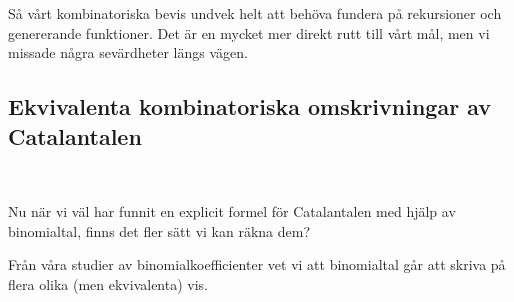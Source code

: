 \documentclass{tufte-handout}
\begin{document}
Så vårt kombinatoriska bevis undvek helt att behöva fundera på rekursioner och genererande funktioner. Det är en mycket mer direkt rutt till vårt mål, men vi missade några sevärdheter längs vägen.


\subsection{Ekvivalenta kombinatoriska omskrivningar av Catalantalen}\hfill\\\par
Nu när vi väl har funnit en explicit formel för Catalantalen med hjälp av binomialtal, finns det fler sätt vi kan räkna dem?\par
\noindent Från våra studier av binomialkoefficienter vet vi att binomialtal går att skriva på flera olika (men ekvivalenta) vis. 
\end{document}
